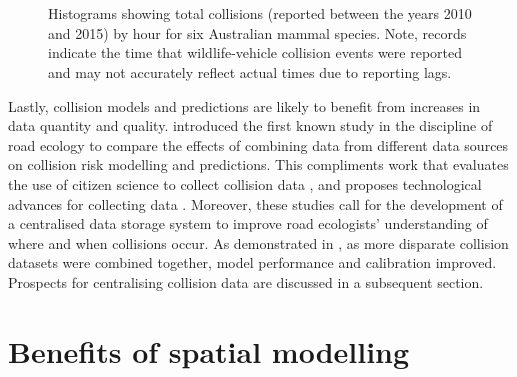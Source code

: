 \begin{figure*}[!t]
  \centering
	\begin{minipage}[t]{.9\textwidth}
    	\centering
    	\hspace{.05\textwidth}
    	\\ 
    	\hspace{.05\textwidth}
    	\\
    	\hspace{.05\textwidth}
    \end{minipage}
  \caption[Total collisions by hour for six mammal species]{Histograms showing total collisions (reported between the years 2010 and 2015) by hour for six Australian mammal species. Note, records indicate the time that wildlife-vehicle collision events were reported and may not accurately reflect actual times due to reporting lags.}
  \label{temporal_all}
\end{figure*}

Lastly, collision models and predictions are likely to benefit from increases in data quantity and quality.  introduced the first known study in the discipline of road ecology to compare the effects of combining data from different data sources on collision risk modelling and predictions. This compliments work that evaluates the use of citizen science to collect collision data \citep{paul14, dwye16}, and proposes technological advances for collecting data \citep{olso14}. Moreover, these studies call for the development of a centralised data storage system to improve road ecologists' understanding of where and when collisions occur. As demonstrated in , as more disparate collision datasets were combined together, model performance and calibration improved. Prospects for centralising collision data are discussed in a subsequent section. 

\section{Benefits of spatial modelling}

